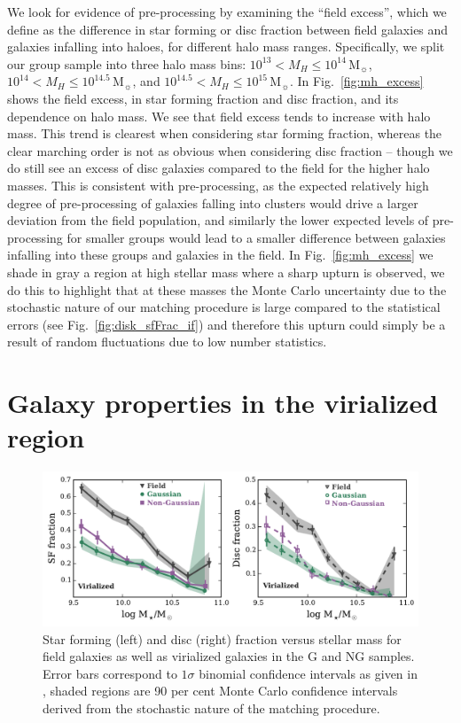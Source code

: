 \documentclass[a4paper,fleqn,usenatbib]{mnras}
\newcommand{\Msun}{\,\mathrm{M_{\sun}}}
\begin{document}
We look for evidence of pre-processing by examining the ``field
excess'', which we define as the difference in star forming or disc
fraction between field galaxies and galaxies infalling into haloes,
for different halo mass ranges.  Specifically, we split our group
sample into three halo mass bins: $10^{13} < M_H \le 10^{14}\Msun$,
  $10^{14} < M_H \le 10^{14.5}\Msun$, and $10^{14.5} < M_H \le
  10^{15}\Msun$.  In Fig.~\ref{fig:mh_excess} shows
the field excess, in star forming fraction and disc
fraction, and its dependence on halo mass.  We see that field excess
tends to increase with halo mass.  This trend is clearest when
considering star forming fraction, whereas the clear marching order is
not as obvious when considering disc fraction -- though we do still
see an excess of disc galaxies compared to the field for the higher
halo masses.  This is consistent with pre-processing, as
the expected relatively high degree of pre-processing of galaxies falling into
clusters would drive a larger deviation from the field population, and
similarly the lower expected levels of pre-processing for smaller
groups would lead to a smaller difference between galaxies infalling into
these groups and galaxies in the field.  In Fig.~\ref{fig:mh_excess}
we shade in gray a region at high stellar mass where a sharp upturn is
observed, we do this to highlight that at these masses the Monte Carlo
uncertainty due to the stochastic nature of our matching procedure is
large compared to the statistical errors (see
Fig.~\ref{fig:disk_sfFrac_if}) and therefore this upturn could simply
be a result of random fluctuations due to
low number statistics.


\section{Galaxy properties in the virialized region}
\label{sec:virial}

\begin{figure}
  \centering
  \includegraphics[width=\textwidth]{disk_sfFrac95_w2_v.pdf}
  \caption{Star forming (left) and disc (right) fraction versus stellar mass for
    field galaxies as well as virialized galaxies in the G and NG
    samples.  Error bars correspond to $1 \sigma$ binomial confidence
    intervals as given in \citet{cameron2011}, shaded regions are 90
    per cent Monte Carlo confidence intervals derived from the
    stochastic nature of the matching procedure.}
  \label{fig:disk_sfFrac_v}
\end{figure}
\end{document}
